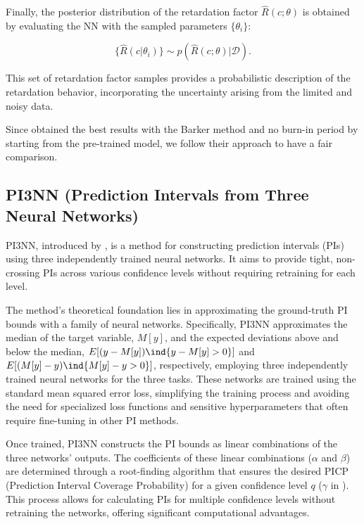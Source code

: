 Finally, the posterior distribution of the retardation factor $\hat{R}(c;\theta)$ is obtained by evaluating the NN with the sampled parameters $\{\theta_i\}$:

\begin{equation*}
\{\hat{R}(c | \theta_i)\} \sim p(\hat{R}(c;\theta) | \mathcal{D}) .
\end{equation*}

This set of retardation factor samples provides a probabilistic description of the retardation behavior, incorporating the uncertainty arising from the limited and noisy data.

Since \citet{finn} obtained the best results with the Barker method and no burn-in period by starting from the pre-trained model, we follow their approach to have a fair comparison.




\subsection{PI3NN (Prediction Intervals from Three Neural Networks)}
PI3NN, introduced by \citet{pi3nn}, is a method for constructing prediction intervals (PIs) using three independently trained neural networks. It aims to provide tight, non-crossing PIs across various confidence levels without requiring retraining for each level.

The method's theoretical foundation lies in approximating the ground-truth PI bounds with a family of neural networks. Specifically, PI3NN approximates the median of the target variable, $M[y]$, and the expected deviations above and below the median, $E[(y - M[y]) \ind{y-M[y]>0}]$ and $E[(M[y] - y) \ind{M[y]-y>0}]$, respectively, employing three independently trained neural networks for the three tasks. These networks are trained using the standard mean squared error loss, simplifying the training process and avoiding the need for specialized loss functions and sensitive hyperparameters that often require fine-tuning in other PI methods.

Once trained, PI3NN constructs the PI bounds as linear combinations of the three networks' outputs. The coefficients of these linear combinations ($\alpha$ and $\beta$) are determined through a root-finding algorithm that ensures the desired PICP (Prediction Interval Coverage Probability) for a given confidence level $q$ ($\gamma$ in \cite{pi3nn}). This process allows for calculating PIs for multiple confidence levels without retraining the networks, offering significant computational advantages.

